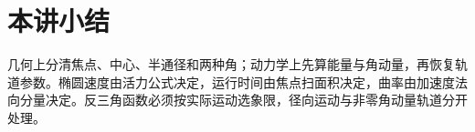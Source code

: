 \section{本讲小结}
几何上分清焦点、中心、半通径和两种角；动力学上先算能量与角动量，再恢复轨道参数。椭圆速度由活力公式决定，运行时间由焦点扫面积决定，曲率由加速度法向分量决定。反三角函数必须按实际运动选象限，径向运动与非零角动量轨道分开处理。
